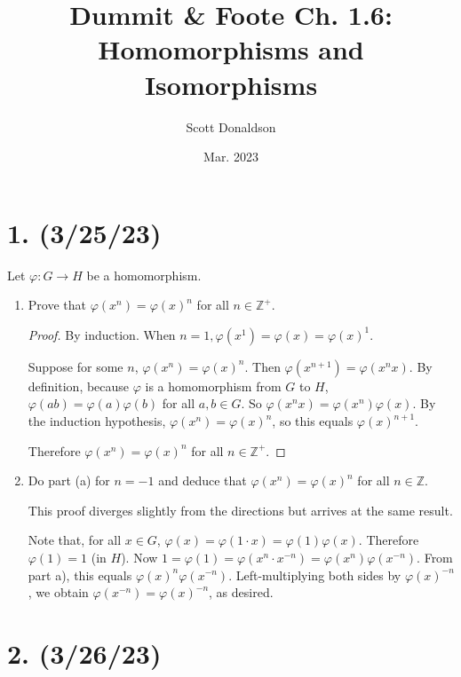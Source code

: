\documentclass{article}
\title{Dummit \& Foote Ch. 1.6: Homomorphisms and Isomorphisms}
\author{Scott Donaldson}
\date{Mar. 2023}
\begin{document}
\maketitle

\section*{1. (3/25/23)}

Let $\varphi: G \rightarrow H$ be a homomorphism.

\begin{enumerate}[label=(\alph*)]
    \item Prove that $\varphi(x^n) = \varphi(x)^n$ for all $n \in \mathbb{Z}^+$.
          \begin{proof}
            By induction. When $n = 1, \varphi(x^1) = \varphi(x) = \varphi(x)^1$.

            Suppose for some $n$, $\varphi(x^n) = \varphi(x)^n$. Then $\varphi(x^{n + 1}) = \varphi(x^n x)$. By definition, because $\varphi$ is a homomorphism from $G$ to $H$, $\varphi(ab) = \varphi(a)\varphi(b)$ for all $a, b \in G$. So $\varphi(x^n x) = \varphi(x^n) \varphi(x)$. By the induction hypothesis, $\varphi(x^n) = \varphi(x)^n$, so this equals $\varphi(x)^{n + 1}$.

            Therefore $\varphi(x^n) = \varphi(x)^n$ for all $n \in \mathbb{Z}^+$.
          \end{proof}

    \item Do part (a) for $n = -1$ and deduce that $\varphi(x^n) = \varphi(x)^n$ for all $n \in \mathbb{Z}$.
    
          This proof diverges slightly from the directions but arrives at the same result.
          
          Note that, for all $x \in G$, $\varphi(x) = \varphi(1 \cdot x) = \varphi(1) \varphi(x)$. Therefore $\varphi(1) = 1$ (in $H$). Now $1 = \varphi(1) = \varphi(x^n \cdot x^{-n}) = \varphi(x^n) \varphi(x^{-n})$. From part a), this equals $\varphi(x)^n \varphi(x^{-n})$. Left-multiplying both sides by $\varphi(x)^{-n}$, we obtain $\varphi(x^{-n}) = \varphi(x)^{-n}$, as desired.
          
\end{enumerate}

\section*{2. (3/26/23)}
\end{document}
